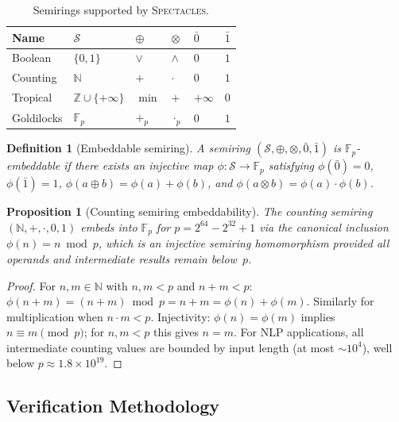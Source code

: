 \documentclass[11pt]{article}
\newtheorem{definition}[theorem]{Definition}
\newtheorem{proposition}[theorem]{Proposition}
\newcommand{\spectacles}{\textsc{Spectacles}}
\newcommand{\N}{\mathbb{N}}
\newcommand{\Z}{\mathbb{Z}}
\newcommand{\F}{\mathbb{F}}
\newcommand{\semiring}[1]{\mathcal{#1}}
\begin{document}
\begin{table}[h]
\centering
\caption{Semirings supported by \spectacles.}\label{tab:semirings}
\smallskip
\begin{tabular}{@{}llllll@{}}
\toprule
\textbf{Name} & $\semiring{S}$ & $\oplus$ & $\otimes$ & $\bar{0}$ & $\bar{1}$ \\
\midrule
Boolean   & $\{0,1\}$             & $\lor$  & $\land$ & $0$ & $1$ \\
Counting  & $\N$                  & $+$     & $\cdot$ & $0$ & $1$ \\
Tropical  & $\Z\cup\{+\infty\}$   & $\min$  & $+$     & $+\infty$ & $0$ \\
Goldilocks& $\F_p$                & $+_p$   & $\cdot_p$ & $0$ & $1$ \\
\bottomrule
\end{tabular}
\end{table}

\begin{definition}[Embeddable semiring]\label{def:embedding}
A semiring $(\semiring{S},\oplus,\otimes,\bar{0},\bar{1})$ is
\emph{$\F_p$-embeddable} if there exists an injective map
$\phi:\semiring{S}\to\F_p$ satisfying
$\phi(\bar{0}) = 0$, $\phi(\bar{1}) = 1$,
$\phi(a\oplus b) = \phi(a) + \phi(b)$, and
$\phi(a\otimes b) = \phi(a) \cdot \phi(b)$.
\end{definition}

\begin{proposition}[Counting semiring embeddability]\label{prop:counting-embed}
The counting semiring $(\N, +, \cdot, 0, 1)$ embeds into $\F_p$ for
$p = 2^{64} - 2^{32} + 1$ via the canonical inclusion $\phi(n) = n \bmod p$,
which is an injective semiring homomorphism provided all operands and
intermediate results remain below~$p$.
\end{proposition}

\begin{proof}
For $n, m \in \N$ with $n, m < p$ and $n + m < p$:
$\phi(n + m) = (n + m) \bmod p = n + m = \phi(n) + \phi(m)$.
Similarly for multiplication when $n \cdot m < p$.
Injectivity: $\phi(n) = \phi(m)$ implies $n \equiv m \pmod{p}$;
for $n, m < p$ this gives $n = m$.
For NLP applications, all intermediate counting values are bounded by
input length (at most $\sim 10^4$), well below $p \approx 1.8 \times 10^{19}$.
\end{proof}

\subsection{Verification Methodology}
\end{document}
